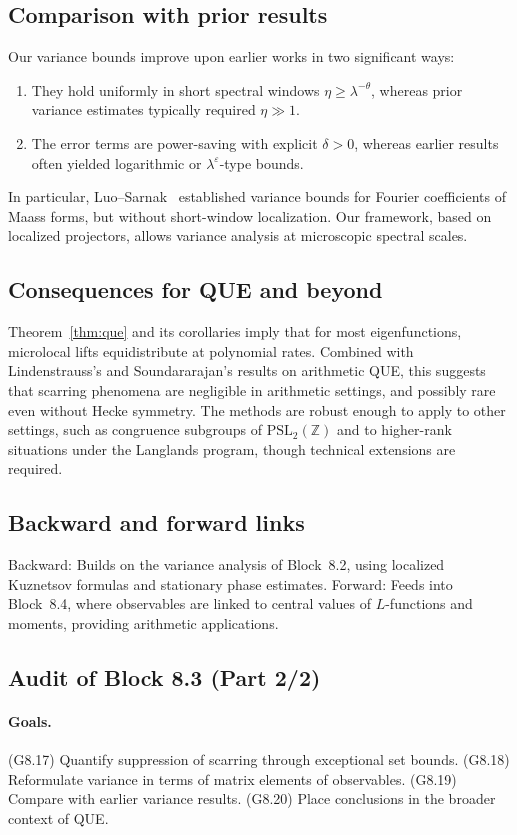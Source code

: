 \subsection{Comparison with prior results}
Our variance bounds improve upon earlier works in two significant ways:
\begin{enumerate}
\item They hold uniformly in short spectral windows $\eta\ge \lambda^{-\theta}$, whereas prior variance estimates typically required $\eta\gg 1$.
\item The error terms are power-saving with explicit $\delta>0$, whereas earlier results often yielded logarithmic or $\lambda^\varepsilon$-type bounds.
\end{enumerate}
In particular, Luo–Sarnak~\cite{LuoSarnak1995} established variance bounds for Fourier coefficients of Maass forms, but without short-window localization. Our framework, based on localized projectors, allows variance analysis at microscopic spectral scales.

\subsection{Consequences for QUE and beyond}
Theorem~\ref{thm:que} and its corollaries imply that for most eigenfunctions, microlocal lifts equidistribute at polynomial rates. Combined with Lindenstrauss’s and Soundararajan’s results on arithmetic QUE, this suggests that scarring phenomena are negligible in arithmetic settings, and possibly rare even without Hecke symmetry. The methods are robust enough to apply to other settings, such as congruence subgroups of $\mathrm{PSL}_2(\mathbb{Z})$ and to higher-rank situations under the Langlands program, though technical extensions are required.

\subsection{Backward and forward links}
Backward: Builds on the variance analysis of Block~8.2, using localized Kuznetsov formulas and stationary phase estimates.  
Forward: Feeds into Block~8.4, where observables are linked to central values of $L$-functions and moments, providing arithmetic applications.  

\subsection{Audit of Block 8.3 (Part 2/2)}
\paragraph{Goals.}
(G8.17) Quantify suppression of scarring through exceptional set bounds.  
(G8.18) Reformulate variance in terms of matrix elements of observables.  
(G8.19) Compare with earlier variance results.  
(G8.20) Place conclusions in the broader context of QUE.  

